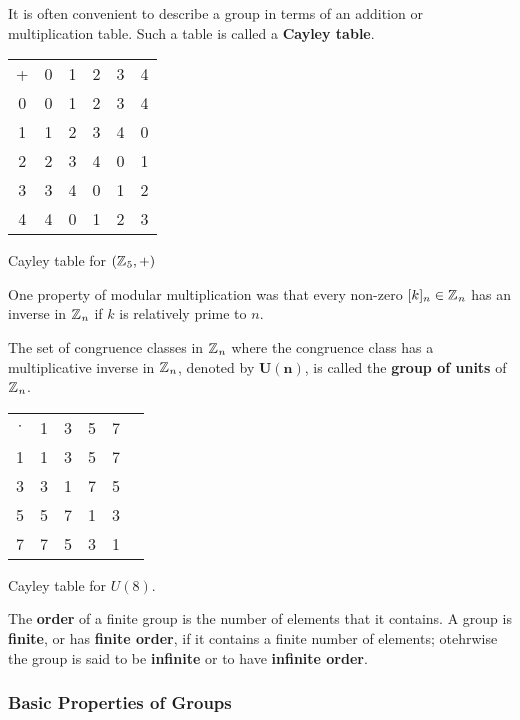 \documentclass[11pt]{article} %
\begin{document}
It is often convenient to describe a group in terms of an addition or multiplication table. Such a table is called a \textbf{Cayley table}.

\begin{center}
\noindent\begin{tabular}{c | c c c c c}
    + & 0 & 1 & 2 & 3 & 4  \\
    \cline{1-6}
    0 & 0 & 1 & 2 & 3 & 4 \\
    1 & 1 & 2 & 3 & 4 & 0 \\
    2 & 2 & 3 & 4 & 0 & 1 \\
    3 & 3 & 4 & 0 & 1 & 2 \\
    4 & 4 & 0 & 1 & 2 & 3 \\
\end{tabular}

\vspace{10pt}
Cayley table for $(\text{$\mathbb{Z}^{}$}_5, +)$
\end{center}

One property of modular multiplication was that every non-zero $[k]_n \in \text{$\mathbb{Z}^{}$}_n$ has an inverse in $\text{$\mathbb{Z}^{}$}_n$ if $k$ is relatively prime to $n$. 
{The set of congruence classes in $\text{$\mathbb{Z}^{}$}_n$ where the congruence class has a multiplicative inverse in $\text{$\mathbb{Z}^{}$}_n$, denoted by $\mathbf{U(n)}$, is called the \textbf{group of units} of $\text{$\mathbb{Z}^{}$}_n$.

\begin{center}
\noindent\begin{tabular}{c | c c c c c}
    $\cdot$ & 1 & 3 & 5 & 7\\
    \cline{1-5}
    1 & 1 & 3 & 5 & 7 \\
    3 & 3 & 1 & 7 & 5 \\
    5 & 5 & 7 & 1 & 3 \\
    7 & 7 & 5 & 3 & 1 \\
\end{tabular}

\vspace{10pt}
Cayley table for $U(8)$.
\end{center}
}

The \textbf{order} of a finite group is the number of elements that it contains. A group is \textbf{finite}, or has \textbf{finite order}, if it contains a finite number of elements; otehrwise the group is said to be \textbf{infinite} or to have \textbf{infinite order}.

\newpage
\subsubsection{Basic Properties of Groups}
\end{document}
